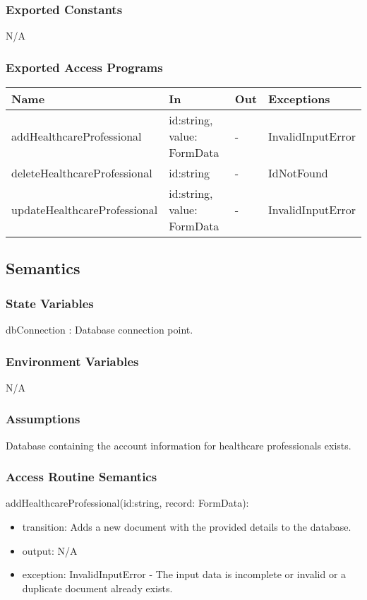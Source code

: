\documentclass[12pt, titlepage]{article}
\begin{document}
\subsubsection{Exported Constants}
N/A

\subsubsection{Exported Access Programs}

\begin{center}
\begin{tabular}{p{4cm} p{4.5cm} p{1cm} p{2.5cm}}
\hline
\textbf{Name} & \textbf{In} & \textbf{Out} & \textbf{Exceptions} \\
\hline
addHealthcareProfessional & id:string, value: FormData & - & InvalidInputError \\
deleteHealthcareProfessional & id:string & - & IdNotFound\\
updateHealthcareProfessional & id:string, value: FormData & - & InvalidInputError \\
\hline
\end{tabular}
\end{center}

\subsection{Semantics}

\subsubsection{State Variables}
dbConnection : Database connection point.

\subsubsection{Environment Variables}
N/A

\subsubsection{Assumptions}
Database containing the account information for healthcare professionals exists.

\subsubsection{Access Routine Semantics}

\noindent addHealthcareProfessional(id:string, record: FormData):
\begin{itemize}
\item transition: Adds a new document with the provided details to the database.
\item output: N/A
\item exception: InvalidInputError - The input data is incomplete or invalid or a duplicate document already exists.
\end{itemize}
\end{document}
